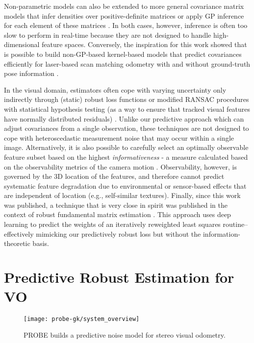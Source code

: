Non-parametric models can also be extended to more general covariance matrix models that infer densities over positive-definite matrices \citep{wilson2011generalised} or apply GP inference for each element of these matrices \citep{melkumyan2011multi}. In both cases, however, inference is often too slow to perform in real-time because they are not designed to handle high-dimensional feature spaces. Conversely, the inspiration for this work showed that is possible to build non-GP-based  kernel-based models that predict covariances efficiently for laser-based scan matching odometry with \citep{VegaBrown:ew} and without \citep{VegaBrown:2013fv} ground-truth pose information .

In the visual domain, estimators often cope with varying uncertainty only indirectly through (static) robust loss functions \citep{kerl2013robust}  or modified RANSAC procedures with statistical hypothesis testing (as a way to ensure that tracked visual features have normally distributed residuals) \citep{Tsotsos2015}. Unlike our predictive approach which can adjust covariances from a single observation, these techniques are not designed to cope with heteroscedastic measurement noise that may occur within a single image. Alternatively, it is also possible to carefully select an optimally observable feature subset based on the highest \textit{informativeness} - a measure calculated based on the observability metrics of the camera motion \citep{Zhang2015}. Observability, however, is governed by the 3D location of the features, and therefore cannot predict systematic feature degradation due to environmental or sensor-based effects that are independent of location (e.g., self-similar textures). Finally, since this work was published, a technique that is very close in spirit was published in the context of robust fundamental matrix estimation \citep{ranftl2018deep}. This approach uses deep learning to predict the weights of an iteratively reweighted least squares routine--effectively mimicking our predictively robust loss but without the information-theoretic basis.

\section{Predictive Robust Estimation for VO}

\begin{figure}
    \centering
      \texttt{[image: probe-gk/system\_overview]}
      \caption{PROBE builds a predictive noise model for stereo visual odometry.}
    \label{fig:probe_gk_system}
\end{figure}

